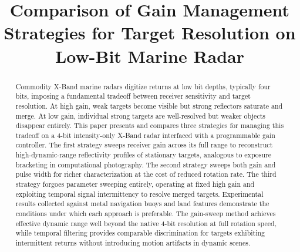 \documentclass[colorlinks,upint,balance]{asmeconf}
\begin{document}

\title{Comparison of Gain Management Strategies for Target Resolution on Low-Bit Marine Radar}



\maketitle


\begin{abstract}
Commodity X-Band marine radars digitize returns at low bit depths, typically four bits, imposing a fundamental tradeoff between receiver sensitivity and target resolution. At high gain, weak targets become visible but strong reflectors saturate and merge. At low gain, individual strong targets are well-resolved but weaker objects disappear entirely. This paper presents and compares three strategies for managing this tradeoff on a 4-bit intensity-only X-Band radar interfaced with a programmable gain controller. The first strategy sweeps receiver gain across its full range to reconstruct high-dynamic-range reflectivity profiles of stationary targets, analogous to exposure bracketing in computational photography. The second strategy sweeps both gain and pulse width for richer characterization at the cost of reduced rotation rate. The third strategy forgoes parameter sweeping entirely, operating at fixed high gain and exploiting temporal signal intermittency to resolve merged targets. Experimental results collected against metal navigation buoys and land features demonstrate the conditions under which each approach is preferable. The gain-sweep method achieves effective dynamic range well beyond the native 4-bit resolution at full rotation speed, while temporal filtering provides comparable discrimination for targets exhibiting intermittent returns without introducing motion artifacts in dynamic scenes.
\end{abstract}
\end{document}
